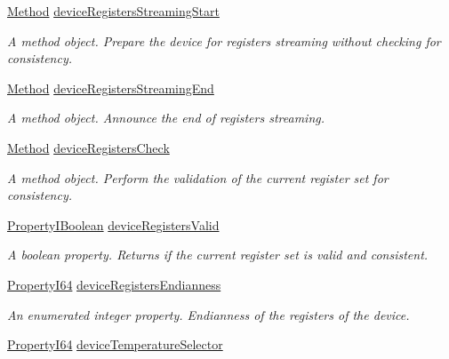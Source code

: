 \begin{DoxyCompactItemize}
\hyperlink{classmv_i_m_p_a_c_t_1_1acquire_1_1_method}{Method} \hyperlink{classmv_i_m_p_a_c_t_1_1acquire_1_1_gen_i_cam_1_1_device_control_a081c8a75b02daceb90b8606542f7efaf}{device\+Registers\+Streaming\+Start}
\begin{DoxyCompactList}\small\item\em A method object. Prepare the device for registers streaming without checking for consistency. \end{DoxyCompactList}\item 
\hyperlink{classmv_i_m_p_a_c_t_1_1acquire_1_1_method}{Method} \hyperlink{classmv_i_m_p_a_c_t_1_1acquire_1_1_gen_i_cam_1_1_device_control_ae36496c8712f92e9ebd582d80299e466}{device\+Registers\+Streaming\+End}
\begin{DoxyCompactList}\small\item\em A method object. Announce the end of registers streaming. \end{DoxyCompactList}\item 
\hyperlink{classmv_i_m_p_a_c_t_1_1acquire_1_1_method}{Method} \hyperlink{classmv_i_m_p_a_c_t_1_1acquire_1_1_gen_i_cam_1_1_device_control_ad9ff87f7a218936a72c833cdc6f5475d}{device\+Registers\+Check}
\begin{DoxyCompactList}\small\item\em A method object. Perform the validation of the current register set for consistency. \end{DoxyCompactList}\item 
\hyperlink{group___common_interface_ga44f9437e24b21b6c93da9039ec6786aa}{Property\+I\+Boolean} \hyperlink{classmv_i_m_p_a_c_t_1_1acquire_1_1_gen_i_cam_1_1_device_control_a25501f7d3647fe89198aa4d5c5044e8b}{device\+Registers\+Valid}
\begin{DoxyCompactList}\small\item\em A boolean property. Returns if the current register set is valid and consistent. \end{DoxyCompactList}\item 
\hyperlink{group___common_interface_ga81749b2696755513663492664a18a893}{Property\+I64} \hyperlink{classmv_i_m_p_a_c_t_1_1acquire_1_1_gen_i_cam_1_1_device_control_adfdc5166018186879414681ad6a7e7d7}{device\+Registers\+Endianness}
\begin{DoxyCompactList}\small\item\em An enumerated integer property. Endianness of the registers of the device. \end{DoxyCompactList}\item 
\hyperlink{group___common_interface_ga81749b2696755513663492664a18a893}{Property\+I64} \hyperlink{classmv_i_m_p_a_c_t_1_1acquire_1_1_gen_i_cam_1_1_device_control_ae11bd1ccc67e69edd3e666c79fff778d}{device\+Temperature\+Selector}

\end{DoxyCompactItemize}
